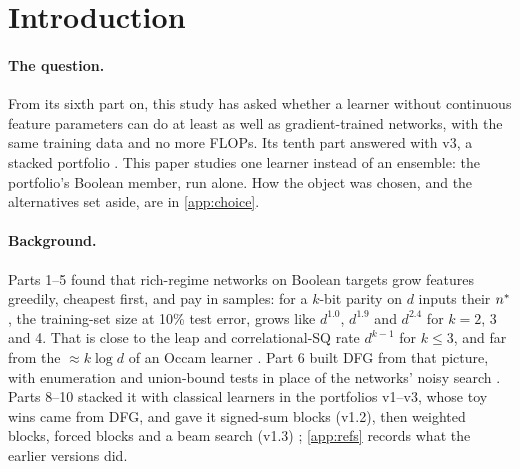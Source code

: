 \section{Introduction}\label{sec:intro}

\paragraph{The question.} From its sixth part on, this study has asked whether a learner without continuous feature parameters can do at least as well as gradient-trained networks, with the same training data and no more FLOPs. Its tenth part answered with v3, a stacked portfolio \cite{portfoliolearner2026}. This paper studies one learner instead of an ensemble: the portfolio's Boolean member, run alone. How the object was chosen, and the alternatives set aside, are in \cref{app:choice}.

\paragraph{Background.} Parts 1--5 found that rich-regime networks on Boolean targets grow features greedily, cheapest first, and pay in samples: for a $k$-bit parity on $d$ inputs their $n^{*}$, the training-set size at 10\% test error, grows like $d^{1.0}$, $d^{1.9}$ and $d^{2.4}$ for $k=2$, 3 and 4. That is close to the leap and correlational-SQ rate $d^{k-1}$ \cite{abbe2023leap} for $k\le3$, and far from the $\approx k\log d$ of an Occam learner \cite{gdcircuit2026}. Part 6 built DFG from that picture, with enumeration and union-bound tests in place of the networks' noisy search \cite{discretelearners2026}. Parts 8--10 stacked it with classical learners in the portfolios v1--v3, whose toy wins came from DFG, and gave it signed-sum blocks (v1.2), then weighted blocks, forced blocks and a beam search (v1.3) \cite{discretelearners2026,portfoliolearner2026}; \cref{app:refs} records what the earlier versions did.

